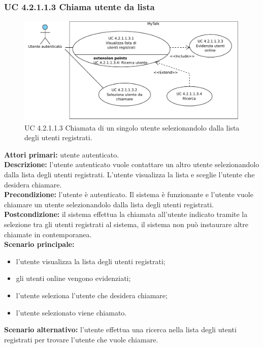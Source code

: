 \subsubsection{UC 4.2.1.1.3 Chiama utente da lista}

\begin{figure}[htbp]
\centering
\includegraphics[scale=0.7]{./casi_uso/UC4-2-1-1-3.pdf}
\caption{UC 4.2.1.1.3 Chiamata di un singolo utente selezionandolo dalla lista degli utenti registrati.}
\end{figure}

\noindent
\textbf{Attori primari:} utente autenticato.\\
\textbf{Descrizione:} l'utente autenticato vuole contattare un altro utente selezionandolo dalla lista degli utenti registrati. L'utente visualizza la lista e sceglie l'utente che desidera chiamare.\\%
\textbf{Precondizione:} l'utente è autenticato. Il sistema è funzionante e l'utente vuole chiamare un utente selezionandolo dalla lista degli utenti registrati.\\
\textbf{Postcondizione:} il sistema effettua la chiamata all'utente indicato tramite la selezione tra gli utenti registrati al sistema, il sistema non può instaurare altre chiamate in contemporanea.\\
\textbf{Scenario principale:}
\begin{itemize}
\item l'utente visualizza la lista degli utenti registrati;
\item gli utenti online vengono evidenziati;
\item l'utente seleziona l'utente che desidera chiamare;
\item l'utente selezionato viene chiamato.
\end{itemize}
\textbf{Scenario alternativo:} l'utente effettua una ricerca nella lista degli utenti registrati per trovare l'utente che vuole chiamare.

